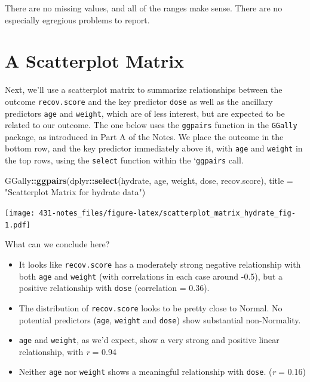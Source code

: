 \documentclass[
]{book}
\newenvironment{Shaded}{\begin{snugshade}}{\end{snugshade}}
\newcommand{\DataTypeTok}[1]{\textcolor[rgb]{0.13,0.29,0.53}{#1}}
\newcommand{\KeywordTok}[1]{\textcolor[rgb]{0.13,0.29,0.53}{\textbf{#1}}}
\newcommand{\NormalTok}[1]{#1}
\newcommand{\OperatorTok}[1]{\textcolor[rgb]{0.81,0.36,0.00}{\textbf{#1}}}
\newcommand{\StringTok}[1]{\textcolor[rgb]{0.31,0.60,0.02}{#1}}
\providecommand{\tightlist}{%
  \setlength{\itemsep}{0pt}\setlength{\parskip}{0pt}}
\begin{document}
There are no missing values, and all of the ranges make sense. There are no especially egregious problems to report.

\hypertarget{a-scatterplot-matrix}{%
\section{A Scatterplot Matrix}\label{a-scatterplot-matrix}}

Next, we'll use a scatterplot matrix to summarize relationships between the outcome \texttt{recov.score} and the key predictor \texttt{dose} as well as the ancillary predictors \texttt{age} and \texttt{weight}, which are of less interest, but are expected to be related to our outcome. The one below uses the \texttt{ggpairs} function in the \texttt{GGally} package, as introduced in Part A of the Notes. We place the outcome in the bottom row, and the key predictor immediately above it, with \texttt{age} and \texttt{weight} in the top rows, using the \texttt{select} function within the `\texttt{ggpairs} call.

\begin{Shaded}
\begin{Highlighting}[]
\NormalTok{GGally}\OperatorTok{::}\KeywordTok{ggpairs}\NormalTok{(dplyr}\OperatorTok{::}\KeywordTok{select}\NormalTok{(hydrate, age, weight, dose, recov.score), }
                \DataTypeTok{title =} \StringTok{"Scatterplot Matrix for hydrate data"}\NormalTok{)}
\end{Highlighting}
\end{Shaded}

\texttt{[image: 431-notes\_files/figure-latex/scatterplot\_matrix\_hydrate\_fig-1.pdf]}

What can we conclude here?

\begin{itemize}
\tightlist
\item
  It looks like \texttt{recov.score} has a moderately strong negative relationship with both \texttt{age} and \texttt{weight} (with correlations in each case around -0.5), but a positive relationship with \texttt{dose} (correlation = 0.36).
\item
  The distribution of \texttt{recov.score} looks to be pretty close to Normal. No potential predictors (\texttt{age}, \texttt{weight} and \texttt{dose}) show substantial non-Normality.
\item
  \texttt{age} and \texttt{weight}, as we'd expect, show a very strong and positive linear relationship, with \emph{r} = 0.94
\item
  Neither \texttt{age} nor \texttt{weight} shows a meaningful relationship with \texttt{dose}. (\emph{r} = 0.16)
\end{itemize}
\end{document}
